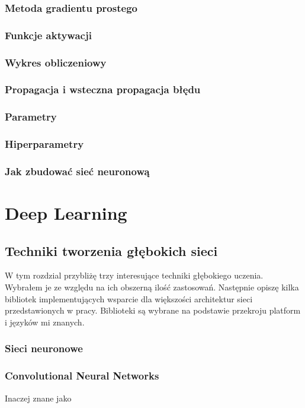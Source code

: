 \documentclass[12pt,a4paper,twoside,titlepage,openright]{book}
\begin{document}
\subsection{Metoda gradientu prostego}
\subsection{Funkcje aktywacji}
\subsection{Wykres obliczeniowy}
\subsection{Propagacja i wsteczna propagacja błędu}
\subsection{Parametry}
\subsection{Hiperparametry}
\subsection{Jak zbudować sieć neuronową}


\chapter{Deep Learning}

\section{Techniki tworzenia głębokich sieci}
W tym rozdzial przybliżę trzy interesujące techniki głębokiego uczenia. Wybrałem je ze względu na ich obszerną ilość zastosowań. Następnie opiszę kilka bibliotek implementujących wsparcie dla większości architektur sieci przedstawionych w pracy. Biblioteki są wybrane na podstawie przekroju platform i języków mi znanych. 

\subsection{Sieci neuronowe}
\subsection{Convolutional Neural Networks}
Inaczej znane jako
\end{document}
